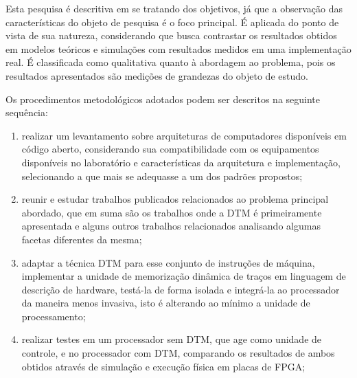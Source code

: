 \label{Metodologia}



Esta pesquisa é descritiva em se tratando dos objetivos, já que a observação das características do objeto de pesquisa é o foco principal. É aplicada do ponto de vista de sua natureza, considerando que busca contrastar os resultados obtidos em modelos teóricos e simulações com resultados medidos em uma implementação real. É classificada como qualitativa quanto à abordagem ao problema, pois os resultados apresentados são medições de grandezas do objeto de estudo.

Os procedimentos metodológicos adotados podem ser descritos na seguinte sequência:

\begin{enumerate}

\item realizar um levantamento sobre arquiteturas de computadores disponíveis em código aberto, considerando sua compatibilidade com os equipamentos disponíveis no laboratório e características da arquitetura e implementação, selecionando a que mais se adequasse a um dos padrões propostos;


\item reunir e estudar trabalhos publicados relacionados ao problema principal abordado, que em suma são os trabalhos onde a DTM é primeiramente apresentada e alguns outros trabalhos relacionados analisando algumas facetas diferentes da mesma;


\item adaptar a técnica DTM para esse conjunto de instruções de máquina, implementar a unidade de memorização dinâmica de traços em linguagem de descrição de hardware, testá-la de forma isolada e integrá-la ao processador da maneira menos invasiva, isto é alterando ao mínimo a unidade de processamento; 

\item realizar testes em um processador sem DTM, que age como unidade de controle, e no processador com DTM, comparando os resultados de ambos obtidos através de  simulação e execução física em placas de FPGA;

\end{enumerate}

